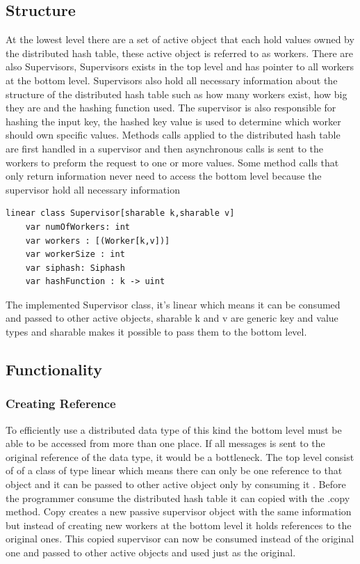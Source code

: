 \subsection{Structure}
At the lowest level there are a set of active object that each hold values owned by the distributed hash table, these active object is referred to as workers. There are also Supervisors, Supervisors exists in the top level and has pointer to all workers at the bottom level. Supervisors also hold all necessary information about the structure of the distributed hash table such as how many workers exist, how big they are and the hashing function used. The supervisor is also responsible for hashing the input key, the hashed key value is used to determine which worker should own specific values. Methods calls applied to the distributed hash table are first handled in a supervisor and then asynchronous calls is sent to the workers to preform the request to one or more values. Some method calls that only return information never need to access the bottom level because the supervisor hold all necessary information \\

\begin{lstlisting}
linear class Supervisor[sharable k,sharable v]
    var numOfWorkers: int
    var workers : [(Worker[k,v])]
    var workerSize : int
    var siphash: Siphash
    var hashFunction : k -> uint
\end{lstlisting}

The implemented Supervisor class, it's linear which means it can be consumed and passed to other active objects, sharable k and v are generic key and value types and sharable makes it possible to pass them to the bottom level.

\subsection{Functionality}
\subsubsection{Creating Reference}
To efficiently use a distributed data type of this kind the bottom level must be able to be accessed from more than one place. If all messages is sent to the original reference of the data type, it would be a bottleneck. The top level consist of of a class of type linear which means there can only be one reference to that object and it can be passed to other active object only by consuming it \cite{kappa}. Before the programmer consume the distributed hash table it can copied with the .copy method. Copy creates a new passive supervisor object with the same information but instead of creating new workers at the bottom level it holds references to the original ones. This copied supervisor can now be consumed instead of the original one and passed to other active objects and used just as the original. \\

